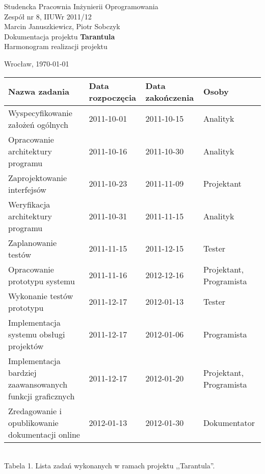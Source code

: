 \documentclass[11pt,leqno]{article}
\begin{document}
\begin{center}
\thispagestyle{empty}
{\Large Studencka Pracownia Inżynierii Oprogramowania}\\[0.5cm]
{\Large Zespół nr 8, IIUWr 2011/12}\\[2.5cm]

{Marcin Januszkiewicz, Piotr Sobczyk}\\[0.5cm]
{\huge Dokumentacja projektu \textbf{Tarantula}}\\[0.25cm]
{ Harmonogram realizacji projektu}\\[0.5cm]

 
\vfill

{\large Wrocław, \today}

\end{center}

\newpage
\newpage

\begin{landscape}

\begin{tabular}{|p{10cm}|l|l|l|}
\hline
Nazwa zadania & Data rozpoczęcia & Data zakończenia & Osoby \\ \hline
Wyspecyfikowanie założeń ogólnych & 2011-10-01 & 2011-10-15 & Analityk \\ \hline
Opracowanie architektury programu & 2011-10-16 & 2011-10-30 & Analityk \\ \hline
Zaprojektowanie interfejsów & 2011-10-23 & 2011-11-09 & Projektant \\ \hline
Weryfikacja architektury programu & 2011-10-31 & 2011-11-15 & Analityk \\ \hline
Zaplanowanie testów & 2011-11-15 & 2011-12-15 & Tester \\ \hline
Opracowanie prototypu systemu & 2011-11-16 & 2012-12-16 & Projektant, Programista \\ \hline
Wykonanie testów prototypu & 2011-12-17 & 2012-01-13 & Tester \\ \hline
Implementacja systemu obsługi projektów & 2011-12-17 & 2012-01-06 & Programista \\ \hline
Implementacja bardziej zaawansowanych funkcji graficznych & 2011-12-17 & 2012-01-20 & Projektant, Programista \\ \hline
Zredagowanie i opublikowanie dokumentacji online & 2012-01-13 & 2012-01-30 & Dokumentator \\ \hline
\end{tabular}
\\[0.5cm]
{\small Tabela 1. Lista zadań wykonanych w ramach projektu ,,Tarantula''.}
\end{landscape}
\end{document}
